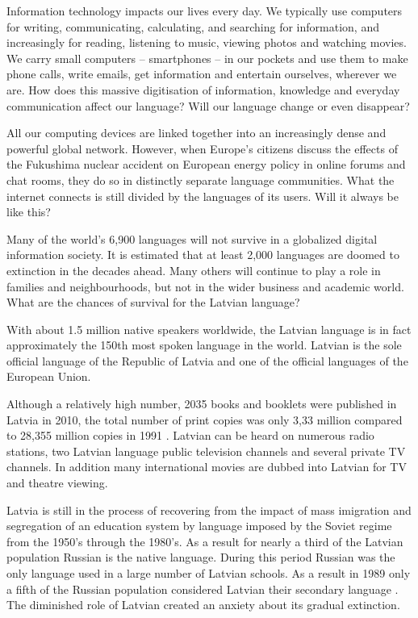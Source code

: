 \begin{multicols}{2}

Information technology impacts our lives every day.
We typically use computers for writing, communicating, calculating, and searching for information, and increasingly for reading, listening to music, viewing photos and watching movies.
We carry small computers – smartphones – in our pockets and use them to make phone calls, write emails, get information and entertain ourselves, wherever we are.
How does this massive digitisation of information, knowledge and everyday communication affect our language?
Will our language change or even disappear? 

All our computing devices are linked together into an increasingly dense and powerful global network.
However, when Europe's citizens discuss the effects of the Fukushima nuclear accident on European energy policy in online forums and chat rooms, they do so in distinctly separate language communities.
What the internet connects is still divided by the languages of its users.
Will it always be like this? 

Many of the world’s 6,900 languages will not survive in a globalized digital information society.
It is estimated that at least 2,000 languages are doomed to extinction in the decades ahead.
Many others will continue to play a role in families and neighbourhoods, but not in the wider business and academic world.
What are the chances of survival for the Latvian language? 

With about 1.5 million native speakers worldwide, the Latvian language is in fact approximately the 150th most spoken language in the world.
Latvian is the sole official language of the Republic of Latvia and one of the official languages of the European Union.
  
Although a relatively high number, 2035 books and booklets were published in Latvia in 2010, the total number of print copies was only 3,33 million compared to 28,355 million copies in 1991 \cite{Meta1ES}.
Latvian can be heard on numerous radio stations, two Latvian language public television channels and several private TV channels.
In addition many international movies are dubbed into Latvian for TV and theatre viewing. 

Latvia is still in the process of recovering from the impact of mass imigration and segregation of an education system by language imposed by the Soviet regime from the 1950’s through the 1980’s.
As a result for nearly a third of the Latvian population Russian is the native language.
During this period Russian was the only language used in a large number of Latvian schools.
As a result in 1989 only a fifth of the Russian population considered Latvian their secondary language \cite{Meta2ES}.
The diminished role of Latvian created an anxiety about its gradual extinction.


\end{multicols}
